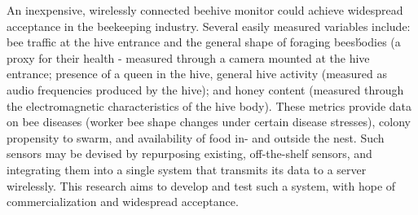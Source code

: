 An inexpensive, wirelessly connected beehive monitor could achieve widespread acceptance in the beekeeping industry. Several easily measured variables include: bee traffic at the hive entrance and the general shape of foraging bees\' bodies (a proxy for their health - measured through a camera mounted at the hive entrance; presence of a queen in the hive, general hive activity (measured as audio frequencies produced by the hive); and honey content (measured through the electromagnetic characteristics of the hive body). These metrics provide data on bee diseases (worker bee shape changes under certain disease stresses), colony propensity to swarm, and availability of food in- and outside the nest. Such sensors may be devised by repurposing existing, off-the-shelf sensors, and integrating them into a single system that transmits its data to a server wirelessly. This research aims to develop and test such a system, with hope of commercialization and widespread acceptance.
